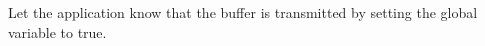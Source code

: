 \begin{DoxyEnumerate}
\item Let the application know that the buffer is transmitted by setting the global variable to true. 
\begin{DoxyCodeInclude}{0}
\end{DoxyCodeInclude}

\end{DoxyEnumerate}